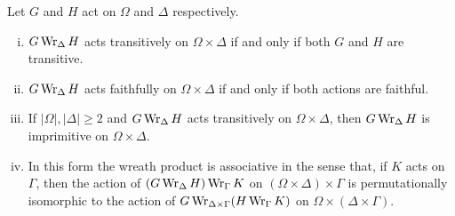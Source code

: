 \begin{proposition} \label{prop-imprim-WP}
	Let $G$ and $H$ act on $\Omega$ and $\Delta$ respectively. 
	\begin{enumerate}[(i)]
		\item $G\operatorname{Wr}_\Delta H$ acts transitively on $\Omega\times \Delta$   if and only if both $G$ and $H$ are transitive.
		\item  $G\operatorname{Wr}_\Delta H$ acts faithfully on $\Omega\times \Delta$ if and only if both actions are faithful.
		\item If $|\Omega|,|\Delta|\geq 2$ and $G\operatorname{Wr}_\Delta H$ acts transitively on $\Omega\times \Delta$, then $G\operatorname{Wr}_\Delta H$ is imprimitive on $\Omega\times \Delta$.
		\item In this form the wreath product is associative in the sense that, if $K$ acts on $\Gamma$, then the action of $(G\operatorname{Wr}_\Delta H) \operatorname{Wr}_\Gamma K$ on $(\Omega\times \Delta) \times \Gamma$  is permutationally isomorphic to the action of $G\operatorname{Wr}_{\Delta\times \Gamma} (H \operatorname{Wr}_\Gamma K)$ on $\Omega\times (\Delta \times \Gamma)$.
	\end{enumerate}
\end{proposition}

